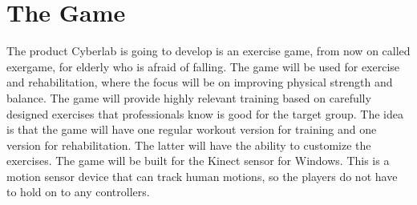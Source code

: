 \section{The Game}
The product Cyberlab is going to develop is an exercise game, from now on called exergame, for elderly who is afraid of falling. The game will be used for exercise and rehabilitation, where the focus will be on improving physical strength and balance. The game will provide highly relevant training based on carefully designed exercises that professionals know is good for the target group. The idea is that the game will have one regular workout version for training and one version for rehabilitation. The latter will have the ability to customize the exercises. The game will be built for the Kinect sensor for Windows. This is a motion sensor device that can track human motions, so the players do not have to hold on to any controllers.

